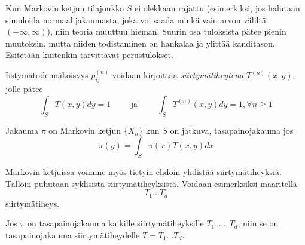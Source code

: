 

Kun Markovin ketjun tilajoukko $S$ ei olekkaan rajattu (esimerkiksi, jos halutaan simuloida normaalijakaumasta, joka voi saada minkä vain arvon väliltä $(-\infty,\infty)$), niin teoria muuttuu hieman. Suurin osa tuloksista pätee pienin muutoksin, mutta niiden todistaminen on hankalaa ja ylittää kanditason. Esitetään kuitenkin tarvittavat perustulokset.


\begin{maar}
	Iistymätodennäköisyys $p^{(n)}_{ij}$ voidaan kirjoittaa \textit{siirtymätiheytenä} $T^{(n)}(x,y)$, jolle pätee
	\begin{equation}\label{siirt-tiheys}
		\int_S T(x,y)dy = 1 \hspace{1cm} \text{ja} \hspace{1cm} \int_S T^{(n)}(x,y)dy = 1, \forall n \geq 1
	\end{equation}
\end{maar}

\begin{maar}
	Jakauma $\pi$ on Markovin ketjun $\{ X_n \}$ kun $S$ on jatkuva, tasapainojakauma jos 
	\begin{equation}
		\pi(y) = \int_S \pi(x) T(x,y) dx
	\end{equation}
\end{maar}

\begin{maar}
	Markovin ketjuissa voimme myös tietyin ehdoin yhdistää siirtymätiheyksiä. Tällöin puhutaan syklisistä siirtymätiheyksistä. Voidaan esimerksiksi määritellä
	\begin{equation*}
		T_1...T_d
	\end{equation*}
	siirtymätiheys.
\end{maar}

\begin{lause}\label{cyclic-kernel}
	Jos $\pi$ on tasapainojakauma kaikille siirtymätiheyksille $T_1,...,T_d$, niin se on tasapainojakauma siirtymätiheydelle $T = T_1...T_d$.
\end{lause}

